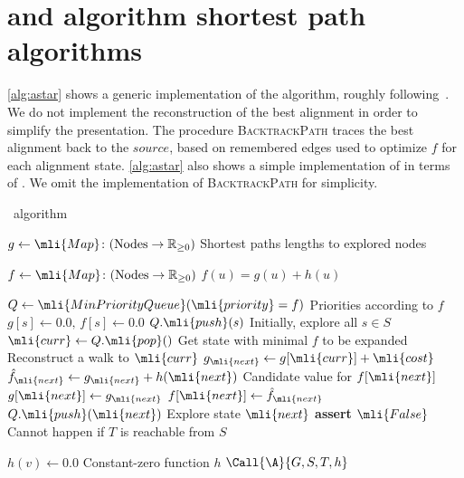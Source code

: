 \section{\dijkstra and \A algorithm shortest path algorithms} \label{sec:astar}

\cref{alg:astar} shows a generic implementation of the \A algorithm,
roughly following~\cite{dechter_generalized_1985}.
We do not implement the reconstruction of the best alignment in order to simplify the presentation.
The procedure \mbox{\textsc{BacktrackPath}} traces the best alignment back to the $source$, based on remembered edges used to optimize $f$ for each alignment state.
%
\cref{alg:astar} also shows a simple implementation of \dijkstra in terms of \A.
We omit the implementation of \textsc{BacktrackPath} for simplicity.

\begin{algorithm}[t]
	\caption{\A~algorithm} \label{alg:astar}
	\begin{algorithmic}[1]
		\State $g \gets \mli{Map}\colon (\text{Nodes} \to \mathbb{R}_{\geq 0})$
		\Comment Shortest paths lengths to explored nodes

		\State $f \gets \mli{Map}\colon (\text{Nodes} \to \mathbb{R}_{\geq 0})$
		\Comment $f(u)=g(u)+h(u)$ 

		\State $Q \gets \mli{MinPriorityQueue}(\mli{priority}=f)$ 
		\Comment Priorities according to $f$
			\State $g[s] \gets 0.0,\, f[s] \gets 0.0$
			\State $Q.\mli{push}(s)$
			\Comment Initially, explore all $s \in S$
		\EndFor
			\State $\mli{curr} \gets Q.\mli{pop}()$
			\Comment Get state with minimal $f$ to be expanded
				\State \Return {}
				\Comment Reconstruct a walk to $\mli{curr}$
			\EndIf
			\State $g_\mli{next} \gets g[\mli{curr}] + \mli{cost}$
			\State $\hat{f}_\mli{next} \gets g_\mli{next} + h(\mli{next})$
				\Comment Candidate value for $f[\mli{next}]$
					\State $g[\mli{next}] \gets g_\mli{next}$		
					\State $f[\mli{next}] \gets \hat{f}_\mli{next}$		
					\State $Q.\mli{push}(\mli{next})$
					\Comment Explore state $\mli{next}$
				\EndIf
		\EndFor
		\EndWhile
		\State \textbf{assert} $\mli{False}$
		\Comment Cannot happen if $T$ is reachable from $S$
		\EndFunction

		\Statex

			\State $h(v) \gets 0.0$
			\Comment Constant-zero function $h$
			\State $\Call{\A}{G,S,T,h}$
		\EndFunction
	\end{algorithmic}
\end{algorithm}
